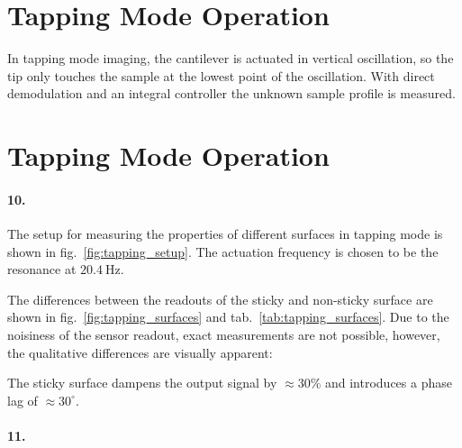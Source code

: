 \documentclass[a4paper,twoside,11pt,DIV=13,BCOR=5mm,numbers=noenddot]{scrbook}
\begin{document}
\section{Tapping Mode Operation}
In tapping mode imaging, the cantilever is actuated in vertical oscillation, so the tip only touches the sample at the lowest point of the oscillation.
With direct demodulation and an integral controller the unknown sample profile is measured.

\FloatBarrier
\section{Tapping Mode Operation}
\paragraph*{10.}


The setup for measuring the properties of different surfaces in tapping mode is shown in fig.~\ref{fig:tapping_setup}.
The actuation frequency is chosen to be the resonance at $\qty{20.4}{\Hz}$.

The differences between the readouts of the sticky and non-sticky surface are shown in fig.~\ref{fig:tapping_surfaces} and tab.~\ref{tab:tapping_surfaces}.
Due to the noisiness of the sensor readout, exact measurements are not possible, however, the qualitative differences are visually apparent:

The sticky surface dampens the output signal  by $\approx 30 \%$ and introduces a phase lag of $\approx 30^{\circ}$.




\paragraph*{11.}
\end{document}
